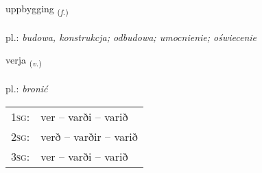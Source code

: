 \documentclass[frontgrid, backgrid]{flacards}\usepackage[]{graphicx}\usepackage[]{xcolor}
\begin{document}
{uppbygging \small{\textsubscript{(\textit{f.})}} \\[1ex] %
\textphonetic{[ʏhpɪciŋk]} \\
pl.: \emph{budowa, konstrukcja; odbudowa; umocnienie; oświecenie} \\  [2ex]
\renewcommand*{\arraystretch}{0.8}
}

\renewcommand{\flhead}{\vskip5pt \fboxsep=0pt {\small\bfseries\footnotesize Sagnorð | Verb}}
\renewcommand{\fcfoot}{\vskip5pt \fboxsep=0pt \hspace{2pt}{\small\bfseries\footnotesize 1K}}

\renewcommand{\blhead}{\vskip5pt {\small\bfseries\footnotesize Sagnorð | Verb }}
\renewcommand{\bcfoot}{\vskip5pt \hspace{2pt}{\small\bfseries\footnotesize 1K}}


{verja \small{\textsubscript{(\textit{v.})}} \\[1ex] %
\textphonetic{[vɛrja]} \\
pl.: \emph{bronić} \\  [2ex]
\renewcommand*{\arraystretch}{0.8}
\begin{tabular}{p{1cm}l}
\textsc{1sg}: & ver -- varði -- varið \\ 
\textsc{2sg}: & verð -- varðir -- varið \\ 
\textsc{3sg}: & ver -- varði -- varið \\ 
\end{tabular}
}


\renewcommand{\flhead}{\vskip5pt \fboxsep=0pt {\small\bfseries\footnotesize Atviksorð | Adverb}}
\renewcommand{\fcfoot}{\vskip5pt \fboxsep=0pt \hspace{2pt}{\small\bfseries\footnotesize 1K}}
\end{document}
